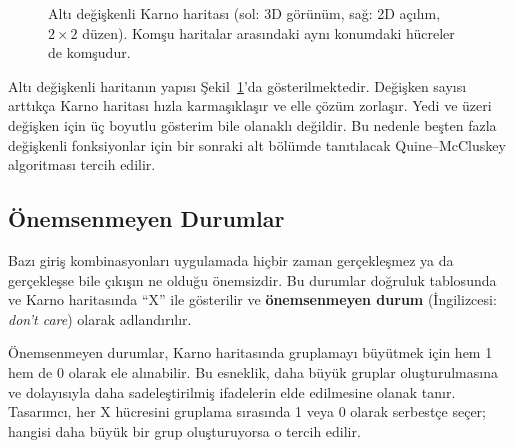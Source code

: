 \begin{figure}[H]
\caption[Altı değişkenli Karno haritası]{Altı değişkenli Karno haritası (sol: 3D görünüm, sağ: 2D açılım, $2 \times 2$ düzen). Komşu haritalar arasındaki aynı konumdaki hücreler de komşudur.}
\label{fig:B.karno6}
\end{figure}

Altı değişkenli haritanın yapısı Şekil~\ref{fig:B.karno6}'da gösterilmektedir. Değişken sayısı arttıkça Karno haritası hızla karmaşıklaşır ve elle çözüm zorlaşır. Yedi ve üzeri değişken için üç boyutlu gösterim bile olanaklı değildir. Bu nedenle beşten fazla değişkenli fonksiyonlar için bir sonraki alt bölümde tanıtılacak Quine--McCluskey algoritması tercih edilir.

\subsection{Önemsenmeyen Durumlar}

Bazı giriş kombinasyonları uygulamada hiçbir zaman gerçekleşmez ya da gerçekleşse bile çıkışın ne olduğu önemsizdir. Bu durumlar doğruluk tablosunda ve Karno haritasında ``X'' ile gösterilir ve \textbf{önemsenmeyen durum} (İngilizcesi: \textit{don't care}) olarak adlandırılır.

Önemsenmeyen durumlar, Karno haritasında gruplamayı büyütmek için hem 1 hem de 0 olarak ele alınabilir. Bu esneklik, daha büyük gruplar oluşturulmasına ve dolayısıyla daha sadeleştirilmiş ifadelerin elde edilmesine olanak tanır. Tasarımcı, her X hücresini gruplama sırasında 1 veya 0 olarak serbestçe seçer; hangisi daha büyük bir grup oluşturuyorsa o tercih edilir.

